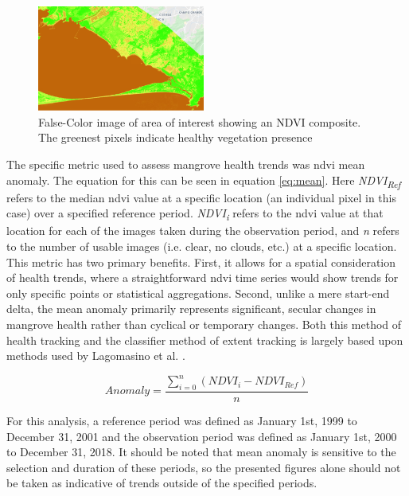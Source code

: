 \begin{figure}[H] 
\centering
\includegraphics[width=0.49\textwidth]{Figures/chap4/guaratiba_ndvi.png}
\caption[False-Color image of area of interest showing an NDVI composite]{False-Color image of area of interest showing an NDVI composite. The greenest pixels indicate healthy vegetation presence}
\label{fig:gndvi}
\end{figure}

The specific metric used to assess mangrove health trends was \ac{ndvi} mean anomaly. The equation for this can be seen in equation \ref{eq:mean}. Here \textit{NDVI\textsubscript{Ref}} refers to the median \ac{ndvi} value at a specific location (an individual pixel in this case) over a specified reference period. \textit{NDVI\textsubscript{i}} refers to the \ac{ndvi} value at that location for each of the images taken during the observation period, and \textit{n} refers to the number of usable images (i.e. clear, no clouds, etc.) at a specific location. This metric has two primary benefits. First, it allows for a spatial consideration of health trends, where a straightforward \ac{ndvi} time series would show trends for only specific points or statistical aggregations. Second, unlike a mere start-end delta, the mean anomaly primarily represents significant, secular changes in mangrove health rather than cyclical or temporary changes. Both this method of health tracking and the classifier method of extent tracking is largely based upon methods used by Lagomasino et al. \cite{lagomasinoMeasuringMangroveCarbon2019, goldbergGlobalDeclinesHuman2020}.

\begin{equation}
\label{eq:mean}
Anomaly = \frac{\sum_{i=0}^{n} (NDVI_i - NDVI_{Ref})}{n}
\end{equation}

For this analysis, a reference period was defined as January 1st, 1999 to December 31, 2001 and the observation period was defined as January 1st, 2000 to December 31, 2018. It should be noted that mean anomaly is sensitive to the selection and duration of these periods, so the presented figures alone should not be taken as indicative of trends outside of the specified periods. 


